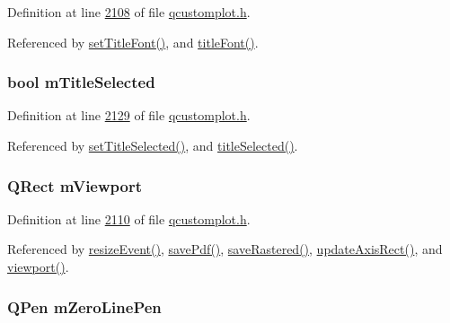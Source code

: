 Definition at line \hyperlink{a00116_source_l02108}{2108} of file \hyperlink{a00116_source}{qcustomplot.\+h}.



Referenced by \hyperlink{a00115_source_l05893}{set\+Title\+Font()}, and \hyperlink{a00116_source_l01954}{title\+Font()}.

\hypertarget{a00116_a36e38c73ea27866ded778ca2a4ce907e}{
\subsubsection[{m\+Title\+Selected}]{\setlength{\rightskip}{0pt plus 5cm}bool m\+Title\+Selected}}\label{a00116_a36e38c73ea27866ded778ca2a4ce907e}


Definition at line \hyperlink{a00116_source_l02129}{2129} of file \hyperlink{a00116_source}{qcustomplot.\+h}.



Referenced by \hyperlink{a00115_source_l06382}{set\+Title\+Selected()}, and \hyperlink{a00116_source_l01979}{title\+Selected()}.

\hypertarget{a00116_a69feeea9d5254eab8ba7f9be13f85e0b}{
\subsubsection[{m\+Viewport}]{\setlength{\rightskip}{0pt plus 5cm}Q\+Rect m\+Viewport}}\label{a00116_a69feeea9d5254eab8ba7f9be13f85e0b}


Definition at line \hyperlink{a00116_source_l02110}{2110} of file \hyperlink{a00116_source}{qcustomplot.\+h}.



Referenced by \hyperlink{a00115_source_l07525}{resize\+Event()}, \hyperlink{a00115_source_l07350}{save\+Pdf()}, \hyperlink{a00115_source_l08146}{save\+Rastered()}, \hyperlink{a00115_source_l08116}{update\+Axis\+Rect()}, and \hyperlink{a00116_source_l01957}{viewport()}.

\hypertarget{a00116_ad8f3f742873da937274c85359dc03f7e}{
\subsubsection[{m\+Zero\+Line\+Pen}]{\setlength{\rightskip}{0pt plus 5cm}Q\+Pen m\+Zero\+Line\+Pen}}\label{a00116_ad8f3f742873da937274c85359dc03f7e}


